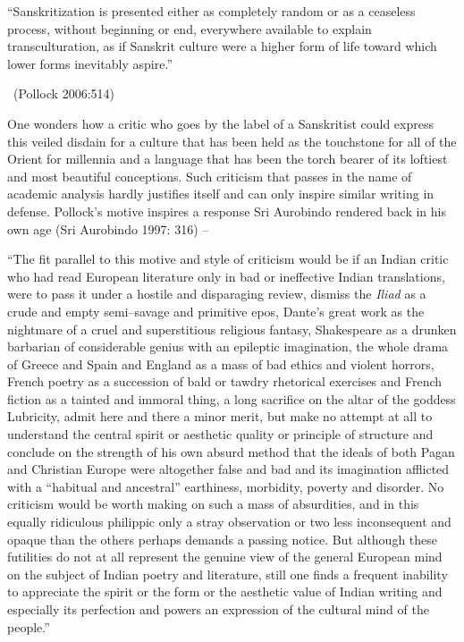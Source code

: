 \begin{myquote}
“Sanskritization is presented either as completely random or as a ceaseless process, without beginning or end, everywhere available to explain transculturation, as if Sanskrit culture were a higher form of life toward which lower forms inevitably aspire.” 

~\hfill (Pollock 2006:514)
\end{myquote}

One wonders how a critic who goes by the label of a Sanskritist could express this veiled disdain for a culture that has been held as the touchstone for all of the Orient for millennia and a language that has been the torch bearer of its loftiest and most beautiful conceptions. Such criticism that passes in the name of academic analysis hardly justifies itself and can only inspire similar writing in defense. Pollock’s motive inspires a response Sri Aurobindo rendered back in his own age (Sri Aurobindo 1997: 316) –

\begin{myquote}
“The fit parallel to this motive and style of criticism would be if an Indian critic who had read European literature only in bad or ineffective Indian translations, were to pass it under a hostile and disparaging review, dismiss the \textit{Iliad} as a crude and empty semi–savage and primitive epos, Dante’s great work as the nightmare of a cruel and superstitious religious fantasy, Shakespeare as a drunken barbarian of considerable genius with an epileptic imagination, the whole drama of Greece and Spain and England as a mass of bad ethics and violent horrors, French poetry as a succession of bald or tawdry rhetorical exercises and French fiction as a tainted and immoral thing, a long sacrifice on the altar of the goddess Lubricity, admit here and there a minor merit, but make no attempt at all to understand the central spirit or aesthetic quality or principle of structure and conclude on the strength of his own absurd method that the ideals of both Pagan and Christian Europe were altogether false and bad and its imagination afflicted with a “habitual and ancestral” earthiness, morbidity, poverty and disorder. No criticism would be worth making on such a mass of absurdities, and in this equally ridiculous philippic only a stray observation or two less inconsequent and opaque than the others perhaps demands a passing notice. But although these futilities do not at all represent the genuine view of the general European mind on the subject of Indian poetry and literature, still one finds a frequent inability to appreciate the spirit or the form or the aesthetic value of Indian writing and especially its perfection and powers an expression of the cultural mind of the people.”
\end{myquote}

